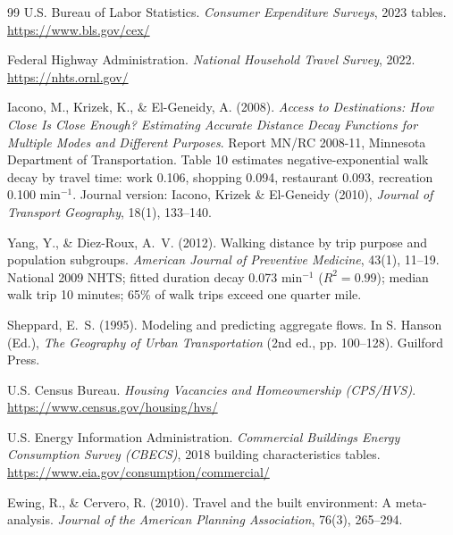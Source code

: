 \documentclass[11pt]{article}
\begin{document}
\begin{thebibliography}{99}
 U.S. Bureau of Labor Statistics. \emph{Consumer Expenditure
Surveys}, 2023 tables. \url{https://www.bls.gov/cex/}

 Federal Highway Administration. \emph{National Household Travel
Survey}, 2022. \url{https://nhts.ornl.gov/}

 Iacono, M., Krizek, K., \& El-Geneidy, A. (2008).
\emph{Access to Destinations: How Close Is Close Enough? Estimating Accurate
Distance Decay Functions for Multiple Modes and Different Purposes}. Report
MN/RC 2008-11, Minnesota Department of Transportation. Table 10 estimates
negative-exponential walk decay by travel time: work 0.106, shopping 0.094,
restaurant 0.093, recreation 0.100 min$^{-1}$. Journal version: Iacono, Krizek
\& El-Geneidy (2010), \emph{Journal of Transport Geography}, 18(1), 133--140.

 Yang, Y., \& Diez-Roux, A.~V. (2012). Walking distance by
trip purpose and population subgroups. \emph{American Journal of Preventive
Medicine}, 43(1), 11--19. National 2009 NHTS; fitted duration decay
0.073 min$^{-1}$ ($R^2 = 0.99$); median walk trip 10 minutes; 65\% of walk
trips exceed one quarter mile.

 Sheppard, E.~S. (1995). Modeling and predicting
aggregate flows. In S. Hanson (Ed.), \emph{The Geography of Urban
Transportation} (2nd ed., pp. 100--128). Guilford Press.

 U.S. Census Bureau. \emph{Housing Vacancies and Homeownership
(CPS/HVS)}. \url{https://www.census.gov/housing/hvs/}

 U.S. Energy Information Administration. \emph{Commercial
Buildings Energy Consumption Survey (CBECS)}, 2018 building characteristics
tables. \url{https://www.eia.gov/consumption/commercial/}

 Ewing, R., \& Cervero, R. (2010). Travel and the built
environment: A meta-analysis. \emph{Journal of the American Planning
Association}, 76(3), 265--294.

\end{thebibliography}
\end{document}
